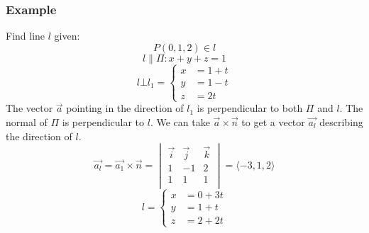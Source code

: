 \documentclass[letterpaper, 12pt]{math}
\begin{document}
\subsubsection*{Example}
Find line \( l \) given:
\[ P(0,1,2)\in l \]
\[ l\parallel\Pi: x+y+z = 1 \]
\[ l\bot l_1 = \begin{cases}
  x &= 1+t \\
  y &= 1-t \\
  z &= 2t
\end{cases} \]
The vector \( \vec{a} \) pointing in the direction of \( l_1 \) is
perpendicular to both \( \Pi \) and \( l \). The normal of \( \Pi \) is
perpendicular to \( l \). We can take \( \vec{a}\times\vec{n} \) to get a
vector \( \vec{a_l} \) describing the direction of \( l \).
\[ \vec{a_l} = \vec{a_1}\times\vec{n} = \begin{vmatrix}
  \vec{i} & \vec{j} & \vec{k} \\
  1 & -1 & 2 \\
  1 & 1 & 1 \\
\end{vmatrix} = \langle-3,1,2\rangle \]
\[ l = \begin{cases}
  x &= 0+3t \\
  y &= 1+t \\
  z &= 2+2t
\end{cases} \]
\end{document}
